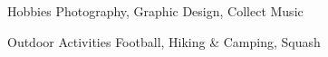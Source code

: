 \begin{cvskills}
\cvskill
	{Hobbies} %
	{Photography, Graphic Design, Collect Music} %

\cvskill
	{Outdoor Activities} %
	{Football, Hiking \& Camping, Squash} %
\end{cvskills}
